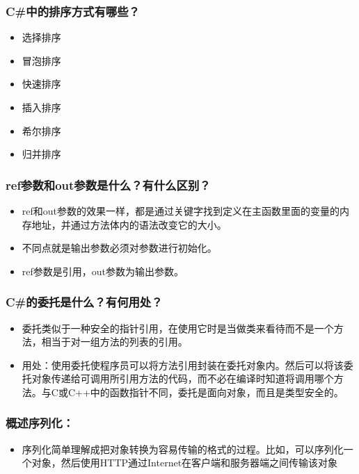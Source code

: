\documentclass[9pt, b5paper]{article}
\begin{document}
\subsubsection{C\#中的排序方式有哪些？}
\label{sec:org361b639}
\begin{itemize}
\item 选择排序
\item 冒泡排序
\item 快速排序
\item 插入排序
\item 希尔排序
\item 归并排序
\end{itemize}

\subsubsection{ref参数和out参数是什么？有什么区别？}
\label{sec:orgd5443a5}
\begin{itemize}
\item ref和out参数的效果一样，都是通过关键字找到定义在主函数里面的变量的内存地址，并通过方法体内的语法改变它的大小。
\item 不同点就是输出参数必须对参数进行初始化。
\item ref参数是引用，out参数为输出参数。
\end{itemize}
\subsubsection{C\#的委托是什么？有何用处？}
\label{sec:org08fb205}
\begin{itemize}
\item 委托类似于一种安全的指针引用，在使用它时是当做类来看待而不是一个方法，相当于对一组方法的列表的引用。
\item 用处：使用委托使程序员可以将方法引用封装在委托对象内。然后可以将该委托对象传递给可调用所引用方法的代码，而不必在编译时知道将调用哪个方法。与C或C++中的函数指针不同，委托是面向对象，而且是类型安全的。
\end{itemize}
\subsubsection{概述序列化：}
\label{sec:org1ccc0cf}
\begin{itemize}
\item 序列化简单理解成把对象转换为容易传输的格式的过程。比如，可以序列化一个对象，然后使用HTTP通过Internet在客户端和服务器端之间传输该对象
\end{itemize}
\end{document}
